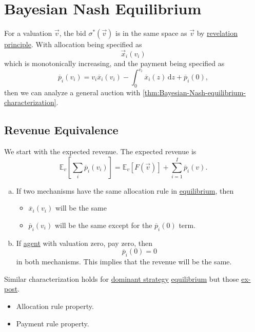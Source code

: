 \section{Bayesian Nash Equilibrium}
\begin{prev}
	For a valuation \(\vec{v}\), the bid \(\sigma^{\ast}(\vec{v})\) is in the same space as \(\vec{v}\) by \hyperref[thm:revelation-principle]{revelation principle}.
	With allocation being specified as
	\[
		\vec{x}_{i}(v_{i})
	\]
	which is monotonically increasing, and the payment being specified as
	\[
		\overline{p}_{i}(v_{i}) = v_{i}\overline{x}_{i}(v_{i}) - \int_0^{v_{i}}\overline{x}_{i}(z)\,\mathrm{d}z + \overline{p}_{i}(0),
	\]
	then we can analyze a general auction with \autoref{thm:Bayesian-Nash-equilibrium-characterization}.
\end{prev}

\subsection{Revenue Equivalence}
We start with the expected revenue. The expected revenue is
\[
	\mathbb{E}_{v}\left[\sum\limits_{i}\overline{p}_{i}(v_{i}) \right] = \mathbb{E}_{v}\left[F(\vec{v})\right] + \sum\limits_{i=1}^{I} \overline{p}_{i}(v).
\]
\begin{enumerate}[(a)]
	\item If two mechanisms have the same allocation rule in \hyperref[def:Nash-equilibrium]{equilibrium}, then
	      \begin{itemize}
		      \item \(\overline{x}_{i}(v_{i})\) will be the same
		      \item \(\overline{p}_{i}(v_{i})\) will be the same except for the \(\overline{p}_{i}(0)\) term.
	      \end{itemize}
	\item If \hyperref[def:player]{agent} with valuation zero, pay zero, then
	      \[
		      \overline{p}_{i}(0) = 0
	      \]
	      in both mechanisms. This implies that the revenue will be the same.
\end{enumerate}

\begin{note}
	Similar characterization holds for \hyperref[def:dominant-strategy]{dominant strategy} \hyperref[def:Nash-equilibrium]{equilibrium} but those \hyperref[def:ex-post]{ex-post}.
	\begin{itemize}
		\item Allocation rule property.
		\item Payment rule property.
	\end{itemize}
\end{note}

